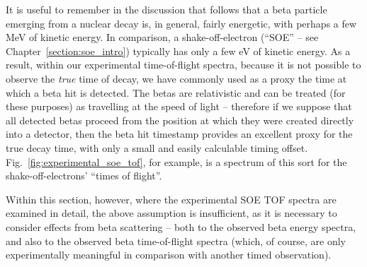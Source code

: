 
It is useful to remember in the discussion that follows that a beta particle emerging from a nuclear decay is, in general, fairly energetic, with perhaps a few MeV of kinetic energy.  In comparison, a shake-off-electron (``SOE'' -- see Chapter~\ref{section:soe_intro}) typically has only a few eV of kinetic energy.   As a result, within our experimental time-of-flight spectra, because it is not possible to observe the \emph{true}  time of decay, we have commonly used as a proxy the time at which a beta hit is detected.  The betas are relativistic and can be treated (for these purposes) as travelling at the speed of light -- therefore if we suppose that all detected betas proceed from the position at which they were created directly into a detector, then the beta hit timestamp provides an excellent proxy for the true decay time, with only a small and easily calculable timing offset.  Fig.~\ref{fig:experimental_soe_tof}, for example, is a spectrum of this sort for the shake-off-electrons' ``times of flight''.  

Within this section, however, where the experimental SOE TOF spectra are examined in detail, the above assumption is insufficient, as it is necessary to consider effects from beta scattering -- both to the observed beta energy spectra, and also to the observed beta time-of-flight spectra (which, of course, are only experimentally meaningful in comparison with another timed observation).  

